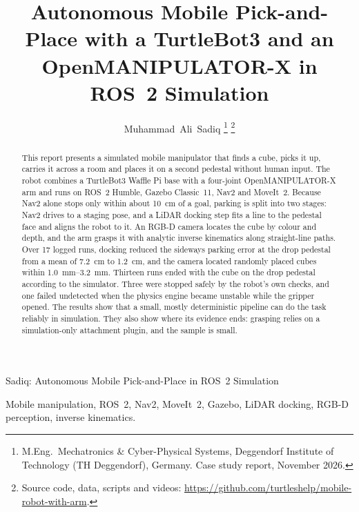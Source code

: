 \documentclass[journal]{IEEEtran}
\begin{document}
\title{Autonomous Mobile Pick-and-Place with a TurtleBot3 and an OpenMANIPULATOR-X in ROS~2 Simulation}

\author{Muhammad~Ali~Sadiq%
\thanks{M.Eng.\ Mechatronics \& Cyber-Physical Systems, Deggendorf Institute of Technology (TH Deggendorf), Germany. Case study report, November 2026.}%
\thanks{Source code, data, scripts and videos: \url{https://github.com/turtleshelp/mobile-robot-with-arm}.}}

%
{Sadiq: Autonomous Mobile Pick-and-Place in ROS~2 Simulation}

\maketitle

\begin{abstract}
This report presents a simulated mobile manipulator that finds a cube, picks it up, carries it across a room and places it on a second pedestal without human input. The robot combines a TurtleBot3 Waffle Pi base with a four-joint OpenMANIPULATOR-X arm and runs on ROS~2 Humble, Gazebo Classic~11, Nav2 and MoveIt~2. Because Nav2 alone stops only within about \SI{10}{cm} of a goal, parking is split into two stages: Nav2 drives to a staging pose, and a LiDAR docking step fits a line to the pedestal face and aligns the robot to it. An RGB-D camera locates the cube by colour and depth, and the arm grasps it with analytic inverse kinematics along straight-line paths. Over 17 logged runs, docking reduced the sideways parking error at the drop pedestal from a mean of \SI{7.2}{cm} to \SI{1.2}{cm}, and the camera located randomly placed cubes within \SIrange{1.0}{3.2}{mm}. Thirteen runs ended with the cube on the drop pedestal according to the simulator. Three were stopped safely by the robot's own checks, and one failed undetected when the physics engine became unstable while the gripper opened. The results show that a small, mostly deterministic pipeline can do the task reliably in simulation. They also show where its evidence ends: grasping relies on a simulation-only attachment plugin, and the sample is small.
\end{abstract}

\begin{IEEEkeywords}
Mobile manipulation, ROS~2, Nav2, MoveIt~2, Gazebo, LiDAR docking, RGB-D perception, inverse kinematics.
\end{IEEEkeywords}
\end{document}
